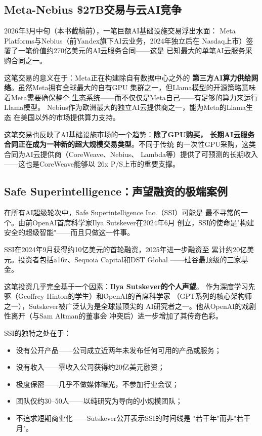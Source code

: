 \subsection{Meta-Nebius \$27B交易与云AI竞争}
\label{subsec:fund-meta-nebius}

2026年3月中旬（本书截稿前），一笔巨额AI基础设施交易浮出水面：
Meta Platforms与Nebius（前Yandex旗下AI云业务，2024年独立后在
Nasdaq上市）签署了一笔价值约270亿美元的AI云服务合同——这是
已知最大的单笔AI云服务采购合同之一。

这笔交易的意义在于：Meta正在构建除自有数据中心之外的
\textbf{第三方AI算力供给网络}。虽然Meta拥有全球最大的自有GPU
集群之一，但Llama模型的开源策略意味着Meta需要确保整个
生态系统——而不仅仅是Meta自己——有足够的算力来运行Llama模型。
Nebius作为欧洲最大的独立AI云提供商之一，能为Meta的Llama生态
在美国以外的市场提供算力支持。

这笔交易也反映了AI基础设施市场的一个趋势：\textbf{除了GPU购买，
长期AI云服务合同正在成为一种新的超大规模交易类型}。不同于传统
的一次性GPU采购，这类合同为AI云提供商（CoreWeave、Nebius、
Lambda等）提供了可预测的长期收入——这也是CoreWeave能够以
26x P/S上市的重要支撑。

\subsection{Safe Superintelligence：声望融资的极端案例}
\label{subsec:fund-ssi}

在所有AI超级轮次中，Safe Superintelligence Inc.（SSI）可能是
最不寻常的一个。由前OpenAI首席科学家Ilya Sutskever在2024年6月
创立，SSI的使命是"构建安全的超级智能"——而且只做这一件事。

SSI在2024年9月获得约10亿美元的首轮融资，2025年进一步融资至
累计约20亿美元。投资者包括a16z、Sequoia Capital和DST Global
——硅谷最顶级的三家基金。

这笔投资几乎完全基于一个因素：\textbf{Ilya Sutskever的个人声望}。
作为深度学习先驱（Geoffrey Hinton的学生）和OpenAI的首席科学家
（GPT系列的核心架构师之一），Sutskever被广泛认为是全球最顶尖的
AI研究者之一。他从OpenAI的戏剧性离开（与Sam Altman的董事会
冲突后）进一步增加了其传奇色彩。

SSI的独特之处在于：
\begin{itemize}
  \item 没有公开产品——公司成立近两年未发布任何可用的产品或服务；
  \item 没有收入——零收入公司获得约20亿美元融资；
  \item 极度保密——几乎不做媒体曝光，不参加行业会议；
  \item 团队仅约30--50人——以纯研究为导向的小规模团队；
  \item 不追求短期商业化——Sutskever公开表示SSI的时间线是
    "若干年"而非"若干月"。
\end{itemize}

